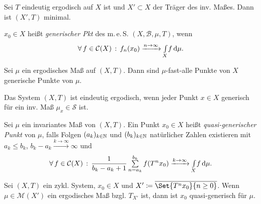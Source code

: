 \documentclass{cheat-sheet}
\newcommand{\clos}[1]{\overline{#1}} %
\newcommand{\Bor}{\mathcal{B}} %
\newcommand{\meS}{m.\,e.\,S.} %
\newcommand{\meST}{$(X, \Bor, \mu, T)$} %
\newcommand{\Cont}{\mathcal{C}} %
\begin{document}
\begin{prop}
  Sei $T$ eindeutig ergodisch auf $X$ ist und $X' \subset X$ der Träger des inv. Maßes. Dann ist $(X', T)$ minimal.
\end{prop}

\begin{defn}
  $x_0 \!\in\! X$ heißt \emph{generischer Pkt} des \meS{} \meST{}, wenn
  \[ \fa{f \in \Cont(X)} f_n(x_0) \xrightarrow{n \to \infty} \Int{X}{}{f}{\mu}. \]
\end{defn}

\begin{prop}
  Sei $\mu$ ein ergodisches Maß auf $(X, T)$. Dann sind $\mu$-fast-alle Punkte von $X$ generische Punkte von $\mu$.
\end{prop}

\begin{prop}
  Das System $(X, T)$ ist eindeutig ergodisch, wenn jeder Punkt $x \in X$ generisch für ein inv. Maß $\mu_x \in \mathcal{S}$ ist.
\end{prop}


\begin{defn}
  Sei $\mu$ ein invariantes Maß von $(X, T)$. Ein Punkt $x_0 \in X$ heißt \emph{quasi-generischer Punkt} von $\mu$, falls Folgen $(a_k)_{k \in \mathbb{N}}$ und $(b_k)_{k \in \mathbb{N}}$ natürlicher Zahlen existieren mit $a_k \leq b_k$, \enspace $b_k - a_k \xrightarrow{k \to \infty} \infty$ und
  \[ \fa{f \in \Cont(X)} \frac{1}{b_k - a_k + 1} \sum_{n=a_k}^{b_k} f(T^n x_0) \xrightarrow{k \to \infty} \Int{X}{}{f}{\mu}. \]
\end{defn}

\begin{prop}
  Sei $(X, T)$ ein zykl. System, $x_0 \!\in\! X$ und $X' \coloneqq \clos{\Set{T^n x_0}{n \geq 0}}$. Wenn $\mu \in \mathcal{M}(X')$ ein ergodisches Maß bzgl. $T_{X'}$ ist, dann ist $x_0$ quasi-generisch für $\mu$.
\end{prop}
\end{document}
